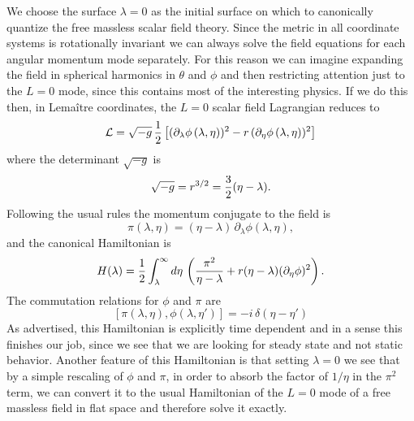 \documentclass[12pt]{article}
\begin{document}
We choose the surface $\lambda = 0$ as the initial surface on which to canonically
quantize the free massless scalar field theory.
Since the metric in all coordinate systems is rotationally invariant
we can always solve the field equations for each angular momentum mode
separately.  For this reason we can imagine expanding the field in
spherical harmonics in $\theta$ and $\phi$ and then restricting attention
just to the $L=0$ mode, since this contains most of the interesting physics.
If we do this then, in Lema\^itre coordinates, the $L=0$ scalar field Lagrangian
reduces to
\begin{equation}
{\cal L} = \sqrt{-g} \,{1\over 2} \left[ (\partial_\lambda \phi\,(\lambda,\eta))^2
- r\,(\partial_\eta\phi\,(\lambda,\eta))^2 \right]
\end{equation}
where the determinant $\sqrt{-g}$ is
\begin{equation}
\sqrt{-g} = r^{3/2} = {3\over 2} (\eta-\lambda).
\end{equation}
Following the usual rules the momentum conjugate to the field is
\begin{equation}
\pi(\lambda,\eta) =  (\eta - \lambda)\,\partial_{\lambda}\phi(\lambda,\eta ) ,
\end{equation}
and the canonical Hamiltonian is
\begin{equation}
H(\lambda) = {1\over 2} \int_{\lambda}^\infty d\eta\,
\left( {\pi^2 \over \eta - \lambda} + r (\eta-\lambda) (\partial_\eta\phi)^2
\right) .
\end{equation}
The commutation relations for $\phi$ and $\pi$ are
\begin{equation}
\left[ \pi(\lambda,\eta), \phi(\lambda,\eta') \right] = -i\,\delta(\eta - \eta')
\end{equation}
As advertised, this Hamiltonian is explicitly time dependent and
in a sense this finishes our job, since we see that we are looking for
steady state and not static behavior.  
Another feature of this Hamiltonian is that setting $\lambda = 0$ we
see that by a simple rescaling of $\phi$ and $\pi$, in order to absorb the factor of
$1/\eta$ in the $\pi^2$ term, we can
convert it to the usual Hamiltonian of the $L=0$ mode of a free massless field
in flat space and therefore solve it exactly.
\end{document}
